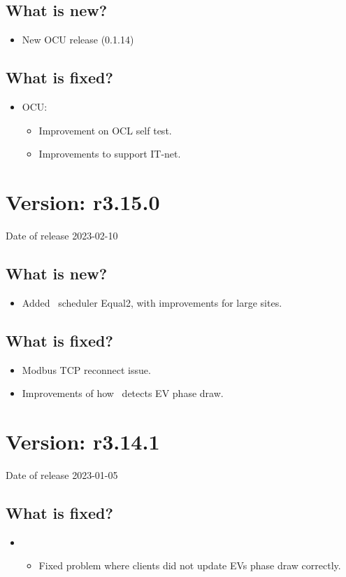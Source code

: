 \documentclass{scrartcl}
\begin{document}
\subsection*{What is new?}
\begin{itemize}
  \item New OCU release (0.1.14)
\end{itemize}

\subsection*{What is fixed?}

\begin{itemize}
\item OCU:
    \begin{itemize}
      \item Improvement on OCL self test.
      \item Improvements to support IT-net.
    \end{itemize}
\end{itemize}

\section{Version: r3.15.0}
Date of release 2023-02-10
\subsection*{What is new?}
\begin{itemize}
  \item Added \nanogrid\ scheduler Equal2, with improvements for large sites.
\end{itemize}
\subsection*{What is fixed?}
\begin{itemize}
  \item Modbus TCP reconnect issue.
  \item Improvements of how \nanogrid\ detects EV phase draw.
\end{itemize}

\section{Version: r3.14.1}
Date of release 2023-01-05
\subsection*{What is fixed?}
\begin{itemize}
  \item \nanogrid\
  \begin{itemize}
  \item Fixed problem where clients did not update EVs phase draw correctly.
  \end{itemize}
\end{itemize}
\end{document}
